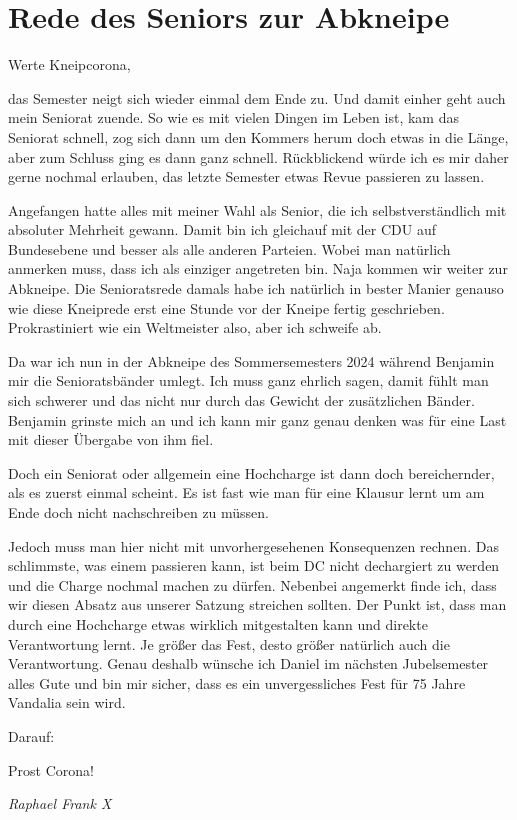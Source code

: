 \section{Rede des Seniors zur Abkneipe}

\begin{multicols}{2}


Werte Kneipcorona,



das Semester neigt sich
wieder einmal dem Ende zu. Und damit einher geht auch mein Seniorat zuende. So
wie es mit vielen Dingen im Leben ist, kam das Seniorat schnell, zog sich dann
um den Kommers herum doch etwas in die Länge, aber zum Schluss ging es dann
ganz schnell. Rückblickend würde ich es mir daher gerne nochmal erlauben, das
letzte Semester etwas Revue passieren zu lassen.



Angefangen hatte alles mit
meiner Wahl als Senior, die ich selbstverständlich mit absoluter Mehrheit
gewann. Damit bin ich gleichauf mit der CDU auf Bundesebene und besser als alle
anderen Parteien. Wobei man natürlich anmerken muss, dass ich als einziger
angetreten bin. Naja kommen wir weiter zur Abkneipe. Die Senioratsrede damals
habe ich natürlich in bester Manier genauso wie diese Kneiprede erst eine
Stunde vor der Kneipe fertig geschrieben. Prokrastiniert wie ein Weltmeister
also, aber ich schweife ab.



Da war ich nun in der
Abkneipe des Sommersemesters 2024 während Benjamin mir die Senioratsbänder
umlegt. Ich muss ganz ehrlich sagen, damit fühlt man sich schwerer und das
nicht nur durch das Gewicht der zusätzlichen Bänder. Benjamin grinste mich an
und ich kann mir ganz genau denken was für eine Last mit dieser Übergabe von
ihm fiel.



Doch ein Seniorat oder
allgemein eine Hochcharge ist dann doch bereichernder, als es zuerst einmal
scheint. Es ist fast wie man für eine Klausur lernt um am Ende doch nicht
nachschreiben zu müssen.



Jedoch muss man hier nicht
mit unvorhergesehenen Konsequenzen rechnen. Das schlimmste, was einem passieren
kann, ist beim DC nicht dechargiert zu werden und die Charge nochmal machen zu
dürfen. Nebenbei angemerkt finde ich, dass wir diesen Absatz aus unserer
Satzung streichen sollten. Der Punkt ist, dass man durch eine Hochcharge etwas
wirklich mitgestalten kann und direkte Verantwortung lernt. Je größer das Fest,
desto größer natürlich auch die Verantwortung. Genau deshalb wünsche ich Daniel
im nächsten Jubelsemester alles Gute und bin mir sicher, dass es ein
unvergessliches Fest für 75 Jahre Vandalia sein wird.



Darauf:



Prost Corona!





	\begin{flushright}
		\hfill\emph{Raphael Frank X}
	\end{flushright}
\end{multicols}